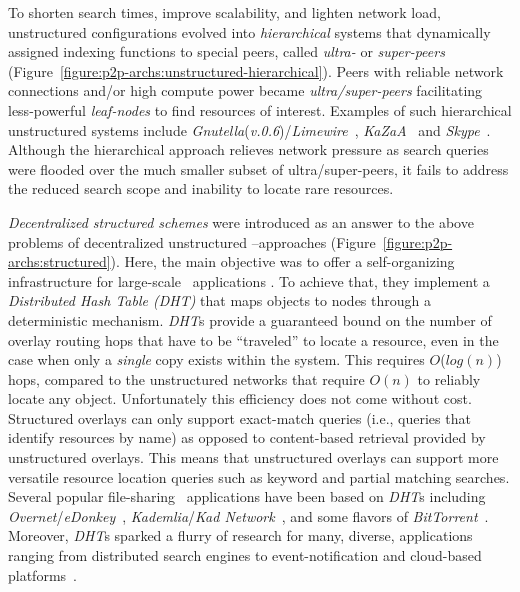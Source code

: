 
To shorten search times, improve scalability, and lighten network load, 
unstructured configurations evolved into \emph{hierarchical} systems 
that dynamically assigned indexing functions to special peers, 
called \emph{ultra-}  or \emph{super-peers} 
(Figure~\ref{figure:p2p-archs:unstructured-hierarchical}). 
Peers with reliable network connections and/or high compute power 
became \emph{ultra/super-peers}
facilitating less-powerful \emph{leaf-nodes} to find resources of
interest. 
Examples of such hierarchical unstructured systems include
{\sl Gnutella}(\emph{v.0.6})/{\sl Limewire}~\cite{gnutella}, 
{\sl KaZaA}~\cite{kazaa} and {\sl Skype}~\cite{skype}. 
Although the hierarchical approach relieves network pressure as
search queries were flooded over the much smaller subset of 
ultra/super-peers, it fails to address the reduced search scope and
inability to locate rare resources.

\emph{Decentralized structured schemes} were introduced as an answer to the above
problems of decentralized unstructured \p--approaches
(Figure~\ref{figure:p2p-archs:structured}).
Here, the main objective was to offer 
a self-organizing infrastructure for large-scale \p\ applications
\cite{ratnasamy_can_2001,stoica_chord_2001,antony_pastry_2001,zhao_tapestry_2001,maymounkov_kademlia_2002,rgrk_bamboo_2004}.
To achieve that, they implement a \emph{Distributed Hash Table (DHT)} that maps
objects to nodes through a deterministic mechanism. \emph{DHT}s provide a
guaranteed bound on the number of overlay routing hops that have to be
``traveled'' to locate a resource, even in the case when only a \emph{single}
copy exists within the system. This requires
$O$($log(n)$) hops, compared to the unstructured networks that require
$O(n)$ to reliably locate any object. Unfortunately this efficiency does not
come without cost. Structured overlays can only support exact-match queries 
(i.e., queries that identify resources by name) as opposed
to content-based retrieval provided by unstructured overlays. 
This means that unstructured overlays can support more versatile 
resource location queries such as keyword and partial matching searches. 
Several popular file-sharing \p\ applications have been based on \emph{DHT}s
including {\sl Overnet}/{\sl eDonkey}~\cite{overnet}, 
{\sl Kademlia}/{\sl Kad Network}~\cite{maymounkov_kademlia_2002},  and 
some flavors of {\sl BitTorrent}~\cite{c_bittorrent_2003}.  
Moreover, \emph{DHT}s sparked
a flurry of research for many, diverse, applications ranging
from distributed search engines to event-notification and cloud-based
platforms~\cite{kbc_oceanstore_2000,rkcd_scribe_2001,mgpj_cloudsnap_2011}.

